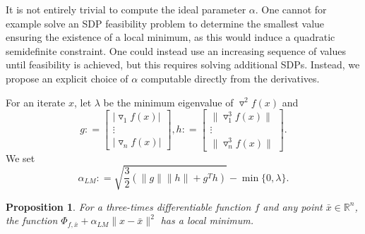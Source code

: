 \documentclass[11pt]{article}
\theoremstyle{plain}
\newtheorem{proposition}[theorem]{Proposition}
\theoremstyle{definition}
\theoremstyle{remark}
\def \bmat{\left[\begin{matrix}}
\def \emat{\end{matrix}\right]}
\def \defeq{\mathrel{\mathop{:}}=}
\def \xbar{\bar{x}}
\def \grad{\triangledown}
\def \Hess{\triangledown^2}
\def \R{\mathbb{R}}
\def \Rn{\R^n}
\def \beq{\begin{equation}}
\def \eeq{\end{equation}}
\begin{document}
It is not entirely trivial to compute the ideal parameter $\alpha$. One cannot for example solve an SDP feasibility problem to determine the smallest value ensuring the existence of a local minimum, as this would induce a quadratic semidefinite constraint. One could instead use an increasing sequence of values until feasibility is achieved, but this requires solving additional SDPs. Instead, we propose an explicit choice of $\alpha$ computable directly from the derivatives.

For an iterate $x$, let $\lambda$ be the minimum eigenvalue of $\Hess f(x)$ and $$g \defeq \bmat |\grad_1 f(x)| \\ \vdots \\ |\grad_n f(x)| \emat ,h \defeq \bmat \|\grad_1^3 f(x)\| \\ \vdots \\ \|\grad_n^3 f(x)\| \emat.$$
We set
\beq \label{Eq: alpha LM} \alpha_{LM} \defeq \sqrt{\frac{3}{2}(\|g\|\|h\| + g^Th)} - \min \{0,\lambda\}.\eeq

\begin{proposition} For a three-times differentiable function $f$ and any point $\xbar \in \Rn$, the function $\Phi_{f,\xbar}+\alpha_{LM}\|x-\xbar\|^2$ has a local minimum.\end{proposition}
\end{document}
